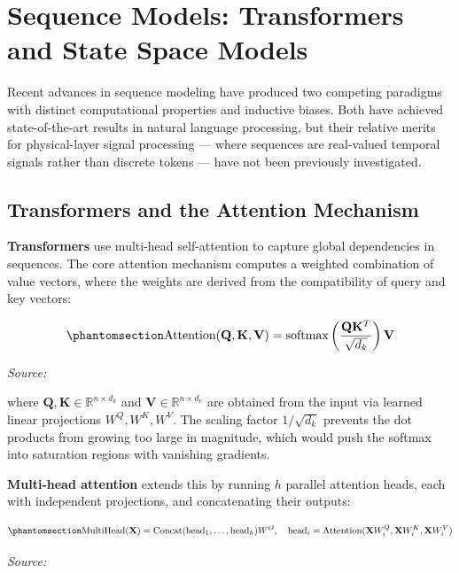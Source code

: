 \section{Sequence Models: Transformers and State Space Models}\label{sec:sequence-models-transformers-and-state-space-models}

Recent advances in sequence modeling have produced two competing paradigms with distinct computational properties and inductive biases. Both have achieved state-of-the-art results in natural language processing, but their relative merits for physical-layer signal processing --- where sequences are real-valued temporal signals rather than discrete tokens --- have not been previously investigated.

\subsection{Transformers and the Attention Mechanism}\label{sec:transformers-and-the-attention-mechanism}

\textbf{Transformers} \cite{vaswani2017attention} use multi-head self-attention to capture global dependencies in sequences. The core attention mechanism computes a weighted combination of value vectors, where the weights are derived from the compatibility of query and key vectors:

\begin{equation}\protect\phantomsection\label{eq:attention}{\text{Attention}(\mathbf{Q}, \mathbf{K}, \mathbf{V}) = \text{softmax}\left(\frac{\mathbf{Q}\mathbf{K}^T}{\sqrt{d_k}}\right)\mathbf{V}
}\end{equation} \par{\small\textit{Source: \cite{vaswani2017attention}}}

where \(\mathbf{Q}, \mathbf{K} \in \mathbb{R}^{n \times d_k}\) and \(\mathbf{V} \in \mathbb{R}^{n \times d_v}\) are obtained from the input via learned linear projections \(W^Q, W^K, W^V\). The scaling factor \(1/\sqrt{d_k}\) prevents the dot products from growing too large in magnitude, which would push the softmax into saturation regions with vanishing gradients.

\textbf{Multi-head attention} extends this by running \(h\) parallel attention heads, each with independent projections, and concatenating their outputs:

\begin{equation}\protect\phantomsection\label{eq:multihead-attention}{\text{MultiHead}(\mathbf{X}) = \text{Concat}(\text{head}_1, \dots, \text{head}_h) W^O, \quad \text{head}_i = \text{Attention}(\mathbf{X} W_i^Q, \mathbf{X} W_i^K, \mathbf{X} W_i^V)
}\end{equation} \par{\small\textit{Source: \cite{vaswani2017attention}}}


